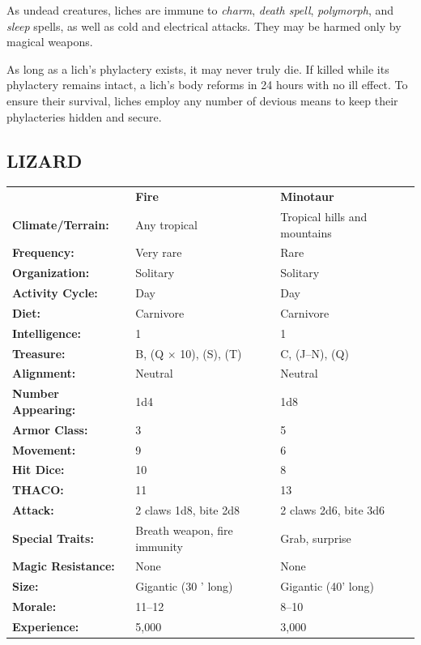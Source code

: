 \begin{multicols}{2}
As undead creatures, liches are immune to \textit{charm}, \textit{death spell}, \textit{polymorph}, and \textit{sleep} spells, as well as cold and electrical attacks.  They may be harmed only by magical weapons.

As long as a lich's phylactery exists, it may never truly die. If killed while its phylactery remains intact, a lich's body reforms in 24 hours with no ill effect. To ensure their survival, liches employ any number of devious means to keep their phylacteries hidden and secure.

\columnbreak %

\noindent
\begin{minipage}{\columnwidth}

\vspace{1em}

\subsection{LIZARD}

\noindent \begin{tabular}{p{}g{.24\columnwidth}p{.24\columnwidth}}
	& \textbf{Fire}	& \textbf{Minotaur}	\\
\textbf{Climate/Terrain:}	& Any tropical	& Tropical hills and mountains	\\
\textbf{Frequency:} 		& Very rare	& Rare	\\
\textbf{Organization:} 		& Solitary	& Solitary	\\
\textbf{Activity Cycle:} 	& Day	& Day	\\
\textbf{Diet:} 				& Carnivore	& Carnivore	\\
\textbf{Intelligence:} 		& 1	& 1	\\
\textbf{Treasure:} 			& B, (Q $\times$ 10), (S), (T)	& C, (J--N), (Q)	\\
\textbf{Alignment:} 		& Neutral	& Neutral	\\
\hline
\textbf{Number Appearing:} 	& 1d4	& 1d8	\\
\textbf{Armor Class:} 		& 3	& 5	\\
\textbf{Movement:} 			& 9	& 6	\\
\textbf{Hit Dice:} 			& 10	& 8	\\
\textbf{THACO:} 			& 11	& 13	\\
\textbf{Attack:} 			& 2 claws 1d8, bite 2d8	& 2 claws 2d6, bite 3d6	\\
\textbf{Special Traits:} & Breath weapon, fire immunity	& Grab, surprise	\\
\textbf{Magic Resistance:} 	& None	& None	\\
\textbf{Size:} 				& Gigantic (30 ' long)	& Gigantic (40' long)	\\
\textbf{Morale:} 			& 11--12	& 8--10	\\
\textbf{Experience:} 		& 5,000	& 3,000	\\ %
\end{tabular}


\end{minipage}
\end{multicols}
